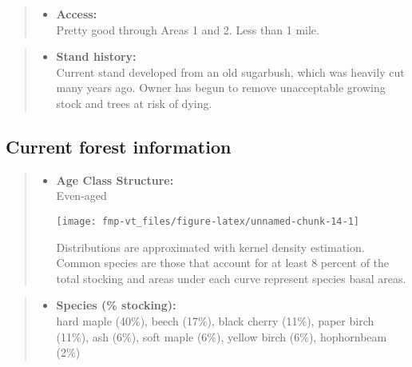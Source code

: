 \documentclass[]{tufte-handout}
\providecommand{\tightlist}{%
  \setlength{\itemsep}{0pt}\setlength{\parskip}{0pt}}
\begin{document}
\begin{quote}
\begin{itemize}
\tightlist
\item
  \textbf{Access:}\\
  \vspace{2pt} Pretty good through Areas 1 and 2. Less than 1 mile.
\end{itemize}
\end{quote}

\begin{quote}
\begin{itemize}
\tightlist
\item
  \textbf{Stand history:}\\
  \vspace{2pt} Current stand developed from an old sugarbush, which was
  heavily cut many years ago. Owner has begun to remove unacceptable
  growing stock and trees at risk of dying.
\end{itemize}
\end{quote}

\subsection{Current forest
information}\label{current-forest-information-2}

\begin{quote}
\begin{itemize}
\tightlist
\item
  \textbf{Age Class Structure:}\\
  \vspace{2pt} Even-aged\\

  \begin{marginfigure}
  \texttt{[image: fmp-vt\_files/figure-latex/unnamed-chunk-14-1]} \caption[Distributions are approximated with kernel density estimation]{Distributions are approximated with kernel density estimation. Common species are those that account for at least 8 percent of the total stocking and areas under each curve represent species basal areas.}\label{fig:unnamed-chunk-14}
  \end{marginfigure}
\end{itemize}
\end{quote}

\begin{quote}
\begin{itemize}
\tightlist
\item
  \textbf{Species (\% stocking):}\\
  \vspace{2pt} hard maple (40\%), beech (17\%), black cherry (11\%),
  paper birch (11\%), ash (6\%), soft maple (6\%), yellow birch (6\%),
  hophornbeam (2\%)
\end{itemize}
\end{quote}
\end{document}

